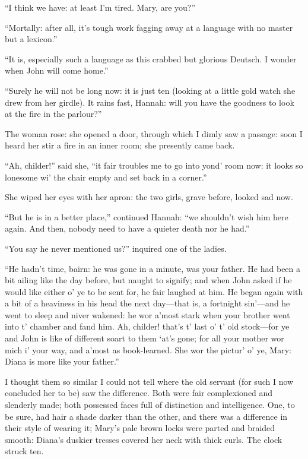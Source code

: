 \enquote{I think we have: at least I'm tired. Mary, are you?}

\enquote{Mortally: after all, it's tough work fagging away at a language
	with no master but a lexicon.}

\enquote{It is, especially such a language as this crabbed but glorious
	Deutsch. I wonder when \St{} John will come home.}

\enquote{Surely he will not be long now: it is just ten (looking at a
	little gold watch she drew from her girdle). It rains fast, Hannah:
	will you have the goodness to look at the fire in the parlour?}

The woman rose: she opened a door, through which I dimly saw a passage:
soon I heard her stir a fire in an inner room; she presently came back.

\enquote{Ah, childer!} said she, \enquote{it fair troubles me to go into
	yond' room now: it looks so lonesome wi' the chair empty and set back in
	a corner.}

She wiped her eyes with her apron: the two girls, grave before, looked
sad now.

\enquote{But he is in a better place,} continued Hannah: \enquote{we
	shouldn't wish him here again. And then, nobody need to have a quieter
	death nor he had.}

\enquote{You say he never mentioned us?} inquired one of the ladies.

\enquote{He hadn't time, bairn: he was gone in a minute, was your
	father. He had been a bit ailing like the day before, but naught to
	signify; and when \Mr{} \St{} John asked if he would like either o' ye to be
	sent for, he fair laughed at him. He began again with a bit of a
	heaviness in his head the next day---that is, a fortnight sin'---and he
	went to sleep and niver wakened: he wor a'most stark when your brother
	went into t' chamber and fand him. Ah, childer! that's t' last o' t'
	old stock---for ye and \Mr{} \St{} John is like of different soart to them
	\enquote{at's gone; for all your mother wor mich i} your way, and
	a'most as book-learned. She wor the pictur' o' ye, Mary: Diana is more
	like your father.}

I thought them so similar I could not tell where the old servant (for
such I now concluded her to be) saw the difference. Both were fair
complexioned and slenderly made; both possessed faces full of
distinction and intelligence. One, to be sure, had hair a shade darker
than the other, and there was a difference in their style of wearing it;
Mary's pale brown locks were parted and braided smooth: Diana's duskier
tresses covered her neck with thick curls. The clock struck ten.

